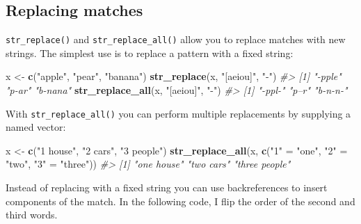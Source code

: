 \documentclass[]{book}
\newenvironment{Shaded}{\begin{snugshade}}{\end{snugshade}}
\newcommand{\KeywordTok}[1]{\textcolor[rgb]{0.13,0.29,0.53}{\textbf{{#1}}}}
\newcommand{\DecValTok}[1]{\textcolor[rgb]{0.00,0.00,0.81}{{#1}}}
\newcommand{\CharTok}[1]{\textcolor[rgb]{0.31,0.60,0.02}{{#1}}}
\newcommand{\StringTok}[1]{\textcolor[rgb]{0.31,0.60,0.02}{{#1}}}
\newcommand{\CommentTok}[1]{\textcolor[rgb]{0.56,0.35,0.01}{\textit{{#1}}}}
\newcommand{\NormalTok}[1]{{#1}}
\begin{document}
\subsection{Replacing matches}\label{replacing-matches}

\texttt{str\_replace()} and \texttt{str\_replace\_all()} allow you to
replace matches with new strings. The simplest use is to replace a
pattern with a fixed string:

\begin{Shaded}
\begin{Highlighting}[]
\NormalTok{x <-}\StringTok{ }\KeywordTok{c}\NormalTok{(}\StringTok{"apple"}\NormalTok{, }\StringTok{"pear"}\NormalTok{, }\StringTok{"banana"}\NormalTok{)}
\KeywordTok{str_replace}\NormalTok{(x, }\StringTok{"[aeiou]"}\NormalTok{, }\StringTok{"-"}\NormalTok{)}
\CommentTok{#> [1] "-pple"  "p-ar"   "b-nana"}
\KeywordTok{str_replace_all}\NormalTok{(x, }\StringTok{"[aeiou]"}\NormalTok{, }\StringTok{"-"}\NormalTok{)}
\CommentTok{#> [1] "-ppl-"  "p--r"   "b-n-n-"}
\end{Highlighting}
\end{Shaded}

With \texttt{str\_replace\_all()} you can perform multiple replacements
by supplying a named vector:

\begin{Shaded}
\begin{Highlighting}[]
\NormalTok{x <-}\StringTok{ }\KeywordTok{c}\NormalTok{(}\StringTok{"1 house"}\NormalTok{, }\StringTok{"2 cars"}\NormalTok{, }\StringTok{"3 people"}\NormalTok{)}
\KeywordTok{str_replace_all}\NormalTok{(x, }\KeywordTok{c}\NormalTok{(}\StringTok{"1"} \NormalTok{=}\StringTok{ "one"}\NormalTok{, }\StringTok{"2"} \NormalTok{=}\StringTok{ "two"}\NormalTok{, }\StringTok{"3"} \NormalTok{=}\StringTok{ "three"}\NormalTok{))}
\CommentTok{#> [1] "one house"    "two cars"     "three people"}
\end{Highlighting}
\end{Shaded}

Instead of replacing with a fixed string you can use backreferences to
insert components of the match. In the following code, I flip the order
of the second and third words.

\begin{Shaded}
\end{Shaded}
\end{document}

